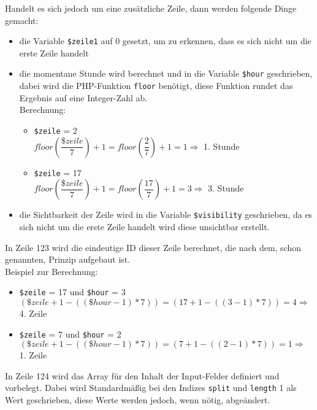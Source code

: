 \begin{enumerate}
	Handelt es sich jedoch um eine zusätzliche Zeile, dann werden folgende Dinge gemacht:
	
	\begin{itemize}
		\item die Variable \texttt{\$zeile1} auf 0 gesetzt, um zu erkennen, dass es sich nicht um die erste Zeile handelt
		\item die momentane Stunde wird berechnet und in die Variable \texttt{\$hour} geschrieben, dabei wird die PHP-Funktion \texttt{floor} benötigt, diese Funktion rundet das Ergebnis auf eine Integer-Zahl ab.\\
		Berechnung:
		
		\begin{itemize}
			\item \texttt{\$zeile} = 2\\
			$ floor(\dfrac{\$zeile}{7}) + 1 = floor( \dfrac{2}{7} ) + 1 = 1 \Rightarrow $ 1. Stunde
			\item \texttt{\$zeile} = 17\\
			$ floor(\dfrac{\$zeile}{7}) + 1 = floor( \dfrac{17}{7} ) + 1 = 3 \Rightarrow $ 3. Stunde\\
		\end{itemize}
		
		\item die Sichtbarkeit der Zeile wird in die Variable \texttt{\$visibility} geschrieben, da es sich nicht um die erste Zeile handelt wird diese unsichtbar erstellt.
	\end{itemize}
	
	In Zeile 123 wird die eindeutige ID dieser Zeile berechnet, die nach dem, schon genannten, Prinzip aufgebaut ist.\\
	Beispiel zur Berechnung:
	
	\begin{itemize}
		\item \texttt{\$zeile} = 17 und \texttt{\$hour} = 3\\
		$ (\$zeile + 1 - ((\$hour - 1 ) \ast 7)) =  (17 + 1 - ((3 - 1) \ast 7)) = 4 \Rightarrow $ 4. Zeile
		\item \texttt{\$zeile} = 7 und \texttt{\$hour} = 2\\
		$ (\$zeile + 1 - ((\$hour - 1 ) \ast 7)) =  (7 + 1 - ((2 - 1) \ast 7)) = 1 \Rightarrow $ 1. Zeile
	\end{itemize}
	
	In Zeile 124 wird das Array für den Inhalt der Input-Felder definiert und vorbelegt. Dabei wird Standardmäßig bei den Indizes \texttt{split} und \texttt{length} 1 als Wert geschrieben, diese Werte werden jedoch, wenn nötig, abgeändert.\\
	

\end{enumerate}
